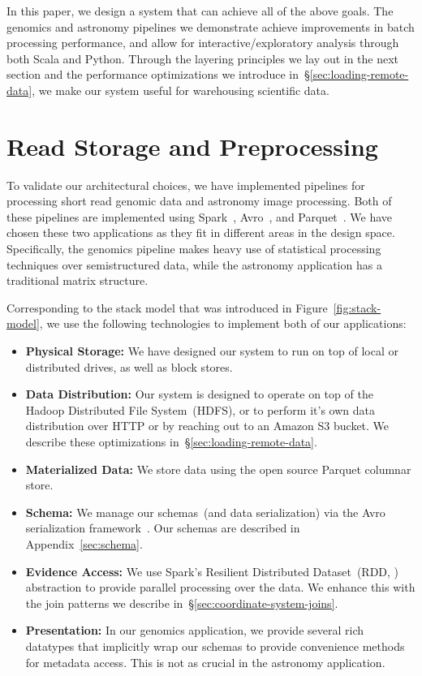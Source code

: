 \documentclass[10pt]{report} %
\begin{document}
In this paper, we design a system that can achieve all of the above goals. The genomics and
astronomy pipelines we demonstrate achieve improvements in batch processing performance, and
allow for interactive/exploratory analysis through both Scala and Python. Through the layering principles
we lay out in the next section and the performance optimizations we introduce
in~\S\ref{sec:loading-remote-data}, we make our system useful for warehousing scientific data.

\chapter{Read Storage and Preprocessing}

To validate our architectural choices, we have implemented pipelines for processing short read genomic
data and astronomy image processing. Both of these pipelines are implemented using
Spark~\cite{zaharia10}, Avro~\cite{avro}, and Parquet~\cite{parquet}. We have chosen these two
applications as they fit in different areas in the design space. Specifically, the genomics pipeline makes
heavy use of statistical processing techniques over semistructured data, while the astronomy application
has a traditional matrix structure.

Corresponding to the stack model that was introduced in Figure~\ref{fig:stack-model}, we use the
following technologies to implement both of our applications:

\begin{itemize}
\item \textbf{Physical Storage:} We have designed our system to run on top of local or distributed
drives, as well as block stores.
\item \textbf{Data Distribution:} Our system is designed to operate on top of the Hadoop Distributed File \linebreak
System~(HDFS), or to perform it's own data distribution over HTTP or by reaching out to an Amazon
S3 bucket. We describe these optimizations in~\S\ref{sec:loading-remote-data}.
\item \textbf{Materialized Data:} We store data using the open source Parquet columnar store.
\item \textbf{Schema:} We manage our schemas~(and data serialization) via the Avro serialization
framework~\cite{avro}. Our schemas are described in Appendix~\ref{sec:schema}.
\item \textbf{Evidence Access:} We use Spark's Resilient Distributed Dataset~(RDD, \cite{zaharia12})
abstraction to provide parallel processing over the data. We enhance this with the join patterns we
describe in~\S\ref{sec:coordinate-system-joins}.
\item \textbf{Presentation:} In our genomics application, we provide several rich datatypes that implicitly
wrap our schemas to provide convenience methods for metadata access. This is not as crucial in the
astronomy application.
\end{itemize}
\end{document}
